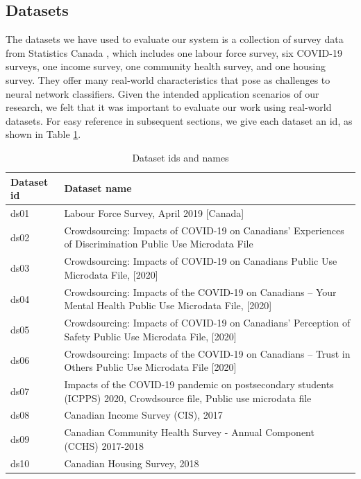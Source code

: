 \documentclass[conference]{IEEEtran}
\begin{document}
\subsection{Datasets}
The datasets we have used to evaluate our system is a collection of survey data from Statistics Canada \cite{ds01, ds02, ds03, ds04, ds05, ds06, ds07, ds08, ds09, ds10}, which includes one labour force survey, six COVID-19 surveys, one income survey, one community health survey, and one housing survey.
They offer many real-world characteristics that pose as challenges to  neural network classifiers.  Given the intended application scenarios of our research, we felt that it was important to evaluate our work using real-world datasets. For easy reference in subsequent sections, we give each dataset an id, as shown in Table \ref{table:id_name}.   
\begin{table}[t]
	\centering
	\begin{tabularx}{\textwidth}{|l|X|}
		\hline
		\textbf{Dataset id} & \textbf{Dataset name} \\
		\hline
		ds01 & Labour Force Survey, April 2019 [Canada] \\
		ds02 & Crowdsourcing: Impacts of COVID-19 on Canadians’ Experiences of Discrimination Public Use Microdata File \\
		ds03 & Crowdsourcing: Impacts of COVID-19 on Canadians Public Use Microdata File, [2020] \\
		ds04 & Crowdsourcing: Impacts of the COVID-19 on Canadians – Your Mental Health Public Use Microdata File, [2020] \\
		ds05 & Crowdsourcing: Impacts of COVID-19 on Canadians' Perception of Safety Public Use Microdata File, [2020] \\
		ds06 & Crowdsourcing: Impacts of the COVID-19 on Canadians – Trust in Others Public Use Microdata File [2020] \\
		ds07 & Impacts of the COVID-19 pandemic on postsecondary students (ICPPS) 2020, Crowdsource file, Public use microdata file \\
		ds08 & Canadian Income Survey (CIS), 2017 \\
		ds09 & Canadian Community Health Survey - Annual Component (CCHS) 2017-2018 \\
		ds10 & Canadian Housing Survey, 2018 \\
		\hline
	\end{tabularx}
	\caption{Dataset ids and names}
	\label{table:id_name}
\end{table}
\end{document}
